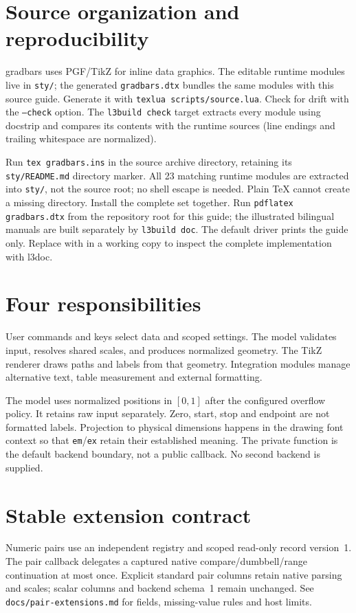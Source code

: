 \section{Source organization and reproducibility}
\textsf{gradbars} uses PGF/TikZ for inline data graphics. The editable runtime
modules live in \texttt{sty/}; the generated \texttt{gradbars.dtx} bundles the
same modules with this source guide. Generate it with
\texttt{texlua scripts/source.lua}. Check for drift with the
\texttt{--check} option. The \texttt{l3build check} target extracts every module using docstrip and
compares its contents with the runtime sources (line endings and trailing
whitespace are normalized).

Run \texttt{tex gradbars.ins} in the source archive directory, retaining its
\texttt{sty/README.md} directory marker. All 23 matching runtime modules are
extracted into \texttt{sty/}, not the source root; no shell escape is needed.
Plain \TeX{} cannot create a missing directory. Install the
complete set together. Run \texttt{pdflatex gradbars.dtx} from the repository
root for this guide; the illustrated bilingual manuals are built separately by
\texttt{l3build doc}. The default driver prints the guide
only. Replace  with  in a working
copy to inspect the complete implementation with \textsf{l3doc}.

\section{Four responsibilities}
User commands and keys select data and scoped settings. The model validates
input, resolves shared scales, and produces normalized geometry. The TikZ
renderer draws paths and labels from that geometry. Integration modules manage
alternative text, table measurement and external formatting.

The model uses normalized positions in $[0,1]$ after the configured overflow
policy. It retains raw input separately. Zero, start, stop and endpoint are
not formatted labels. Projection to physical dimensions happens in the drawing
font context so that \texttt{em}/\texttt{ex} retain their established meaning.
The private  function is the default backend
boundary, not a public callback. No second backend is supplied.

\section{Stable extension contract}
Numeric pairs use an independent registry and scoped read-only record version~1.
The pair callback delegates a captured native compare/dumbbell/range continuation
at most once. Explicit standard pair columns retain native parsing and scales;
scalar columns and backend schema~1 remain unchanged. See
\texttt{docs/pair-extensions.md} for fields, missing-value rules and host limits.

